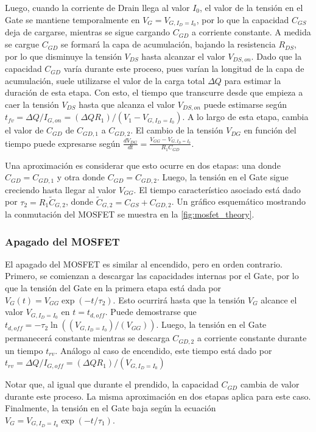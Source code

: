 \documentclass[e4_tp1_main.tex]{subfiles}
\begin{document}
Luego, cuando la corriente de Drain llega al valor $I_0$, el valor de la tensión en el Gate se mantiene temporalmente en $V_G=V_{G,I_D=I_0}$, por lo que la capacidad $C_{GS}$ deja de cargarse, mientras se sigue cargando $C_{GD}$ a corriente constante. A medida se cargue $C_{GD}$ se formará la capa de acumulación, bajando la resistencia $R_{DS}$, por lo que disminuye la tensión $V_{DS}$ hasta alcanzar el valor $V_{DS,on}$. Dado que la capacidad $C_{GD}$ varía durante este proceso, pues varían la longitud de la capa de acumulación, suele utilizarse el valor de la carga total $\Delta Q$ para estimar la duración de esta etapa. Con esto, el tiempo que transcurre desde que empieza a caer la tensión $V_{DS}$ hasta que alcanza el valor $V_{DS,on}$ puede estimarse según $t_{fv} = \Delta Q/I_{G,on} = (\Delta Q R_1)/(V_{1}-V_{G,I_D=I_0})$. A lo largo de esta etapa, cambia el valor de $C_{GD}$ de $C_{GD,1}$ a $C_{GD,2}$. El cambio de la tensión $V_{DG}$ en función del tiempo puede expresarse según $\frac{dV_{DG}}{dt} = \frac{V_{GG}-V_{G,I_D=I_0}}{R_1C_{GD}}.$

Una aproximación es considerar que esto ocurre en dos etapas: una donde $C_{GD} = C_{GD,1}$ y otra donde $C_{GD} = C_{GD,2}$. Luego, la tensión en el Gate sigue creciendo hasta llegar al valor $V_{GG}$. El tiempo característico asociado está dado por $\tau_2 = R_1\tilde{C}_{G,2}$, donde $\tilde{C}_{G,2} = C_{GS} + C_{GD,2}$. Un gráfico esquemático mostrando la conmutación del MOSFET se muestra en la \autoref{fig:mosfet_theory}.




\subsubsection{Apagado del MOSFET}

El apagado del MOSFET es similar al encendido, pero en orden contrario. Primero, se comienzan a descargar las capacidades internas por el Gate, por lo que la tensión del Gate en la primera etapa está dada por $V_G(t) = V_{GG} \exp(-t/\tau_2)$. Esto ocurrirá hasta que la tensión $V_G$ alcance el valor $V_{G,I_D=I_0}$ en $t=t_{d,off}$. Puede demostrarse que $t_{d,off}= -\tau_2\ln\left((V_{G,I_D=I_0})/(V_{GG})\right)$. Luego, la tensión en el Gate permanecerá constante mientras se descarga $C_{GD,2}$ a corriente constante durante un tiempo $t_{rv}$. Análogo al caso de encendido, este tiempo está dado por $t_{rv} = \Delta Q/I_{G,off} = (\Delta Q R_1)/(V_{G,I_D=I_0})$

Notar que, al igual que durante el prendido, la capacidad $C_{GD}$ cambia de valor durante este proceso. La misma aproximación en dos etapas aplica para este caso. Finalmente, la tensión en el Gate baja según la ecuación $V_{G} = V_{G,I_D=I_0}\exp(-t/\tau_1)$.
\end{document}
